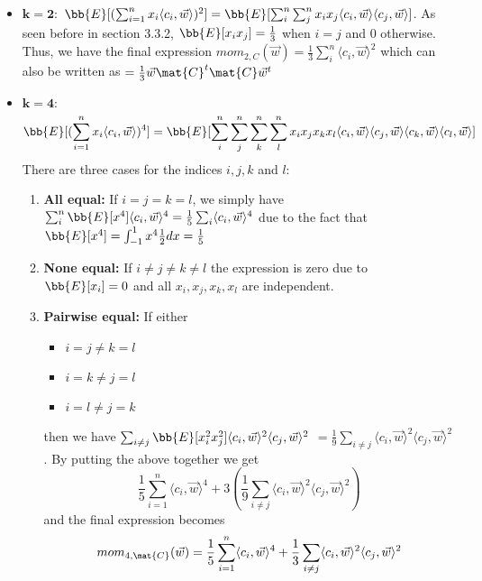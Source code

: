 \begin{itemize}
    \item $\mathbf{k = 2: }$
        $\bb{E}[(\sum_{i=1}^{n} x_i \langle c_i, \vec{w} \rangle ) ^2] = \bb{E}[\sum_{i}^{n} \sum_{j}^{n} x_i x_j \langle c_i, \vec{w} \rangle \langle c_j, \vec{w} \rangle]$.
        As seen before in section 3.3.2, $\bb{E}[x_i x_j] = \frac{1}{3}$ when $i = j$ and $0$ otherwise. Thus, we have the final expression 
        $mom_{2, C}(\vec{w}) = \frac{1}{3} \sum_{i}^{n} \langle c_i, \vec{w} \rangle ^2$ which can also be written as
        $ = \frac{1}{3} \vec{w} \mat{C}^t \mat{C} \vec{w}^t$
    \item $\mathbf{k = 4: }$
        \[ \bb{E}[(\sum_{i=1}^{n} x_i \langle c_i, \vec{w} \rangle ) ^4] = 
        \bb{E}[\sum_{i}^{n} \sum_{j}^{n} \sum_{k}^{n} \sum_{l}^{n} x_i x_j x_k x_l 
        \langle c_i, \vec{w} \rangle \langle c_j, \vec{w} \rangle
    \langle c_k, \vec{w} \rangle \langle c_l, \vec{w} \rangle] \]
    There are three cases for the indices $i, j, k$ and $l$:
    \begin{enumerate}
        \item \textbf{All equal: } If $i = j = k = l$, we simply have $\sum_i^n \bb{E}[x^4] \langle c_i, \vec{w} \rangle ^4 = \frac{1}{5} \sum_i \langle c_i, \vec{w} \rangle ^4$
            due to the fact that $\bb{E}[x ^4] = \int_{-1}^{1} x^4 \frac{1}{2} dx = \frac{1}{5}$
        \item \textbf{None equal:} If $i \neq j \neq k \neq l$ the expression is zero due to $\bb{E}[x_i] = 0$ and all $x_i, x_j, x_k, x_l$ are independent.
        \item \textbf{Pairwise equal:} If either 
            \begin{itemize}
                \item $i = j \neq k = l$
                \item $i = k \neq j = l$ 
                \item $i = l \neq j = k$
            \end{itemize}
            then we have 
            $\sum_{i \neq j} \bb{E}[x_i ^2 x_j^2] \langle c_i, \vec{w} \rangle ^2 \langle c_j, \vec{w} \rangle^2$ 
            $ = \frac{1}{9} \sum_{i \neq j} \langle c_i, \vec{w} \rangle^2 \langle c_j, \vec{w} \rangle^2$. By putting the above together we get
            \[\frac{1}{5} \sum_{i=1}^{n} \langle c_i, \vec{w} \rangle ^4 + 3(\frac{1}{9} \sum_{i \neq j} \langle c_i, \vec{w} \rangle ^2 \langle c_j, \vec{w} \rangle ^2)\]
            and the final expression becomes 
            \[ mom_{4, \mat{C}} (\vec{w}) = \frac{1}{5} \sum_{i=1}^{n} \langle c_i, \vec{w} \rangle ^4 + \frac{1}{3} \sum_{i \neq j} \langle c_i, \vec{w} \rangle ^2 \langle c_j, \vec{w} \rangle ^2\]
    \end{enumerate}


\end{itemize}
